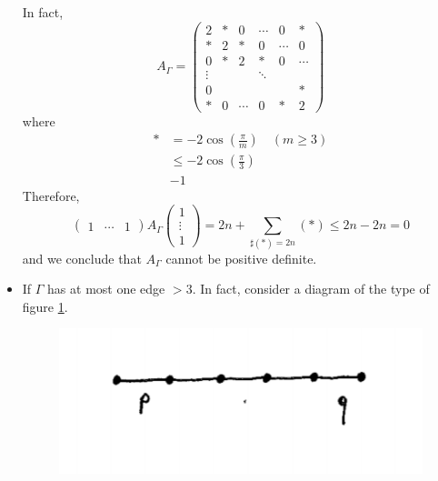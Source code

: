 \begin{itemize}
In fact,
\begin{equation}
A_\Gamma = \begin{pmatrix}
2 &* &0 &\cdots &0 &* \\
* &2 &* &0 &\cdots &0 \\
0 &* &2 &* &0 &\cdots \\
\vdots & & &\ddots & & \\
0 & & & & &* \\
* &0 &\cdots &0 &* &2
\end{pmatrix}
\end{equation} where
\begin{equation}
\begin{split}
* &= - 2 \cos \left( \frac{\pi}{m} \right) \quad (m\ge 3 ) \\
&\le - 2 \cos \left( \frac{\pi}{3} \right) \\
&-1
\end{split}
\end{equation} Therefore,
\begin{equation}
\begin{pmatrix}
1 &\cdots &1
\end{pmatrix} A_\Gamma \begin{pmatrix}
1 \\
\vdots \\
1
\end{pmatrix} = 2n + \sum_{\sharp(*) = 2n} (*) \le 2n - 2n = 0
\label{strategy}
\end{equation} and we conclude that $A_\Gamma$ cannot be positive definite.

\item If $\Gamma$ has at most one edge $>3$. In fact, consider a diagram of the type of figure \ref{cours9fig4}.

\begin{figure}[h!]
\centering
\includegraphics[scale=0.6]{cours9fig4.png}
\caption{}
\label{cours9fig4}
\end{figure}


\end{itemize}
